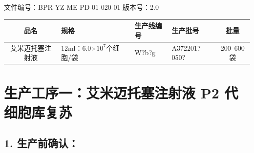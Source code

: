 \documentclass[UTF8,10pt,a4paper,fontset=fandol]{ctexart}
\newcommand{\fieldvalue}[1]{#1}
\newcommand{\handwritten}[1]{#1}
\begin{document}
\noindent
文件编号：BPR-YZ-ME-PD-01-020-01 \qquad 版本号：2.0

\begin{tabularx}{\textwidth}{|c|X|X|X|c|}
\hline
品名 & 规格 & 生产线编号 & 生产批号 & 批量 \\
\hline
\fieldvalue{艾米迈托塞注射液} &
\fieldvalue{12ml：6.0$\times10^{7}$个细胞/袋} &
\fieldvalue{\handwritten{W?b?g}} &
\fieldvalue{\handwritten{A372201?050?}} &
\fieldvalue{200--600袋} \\
\hline
\end{tabularx}

\section*{生产工序一：艾米迈托塞注射液 P2 代细胞库复苏}

\subsection*{1. 生产前确认：}
\end{document}
